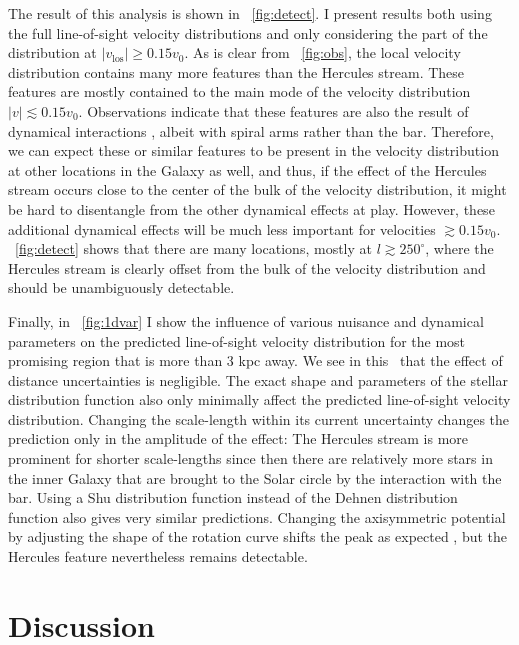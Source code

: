 \documentclass[12pt,preprint]{aastex}
\newcommand{\eg}{e.g.}
\newcommand{\vo}{\ensuremath{v_0}}
\begin{document}
The result of this analysis is shown in
\figurename~\ref{fig:detect}. I present results both using the full
line-of-sight velocity distributions and only considering the part of
the distribution at $|v_{\text{los}}| \geq 0.15 \vo$. As is clear from
\figurename~\ref{fig:obs}, the local velocity distribution contains
many more features than the Hercules stream. These features are mostly
contained to the main mode of the velocity distribution $|v| \lesssim
0.15 \vo$. Observations indicate that these features are also the
result of dynamical interactions \citep[\eg,][]{Bovy10a,sellwood10a},
albeit with spiral arms rather than the bar. Therefore, we can expect
these or similar features to be present in the velocity distribution
at other locations in the Galaxy as well, and thus, if the effect of
the Hercules stream occurs close to the center of the bulk of the
velocity distribution, it might be hard to disentangle from the other
dynamical effects at play. However, these additional dynamical effects
will be much less important for velocities $\gtrsim 0.15
\vo$. \figurename~\ref{fig:detect} shows that there are many
locations, mostly at $l \gtrsim 250^{\circ}$, where the Hercules
stream is clearly offset from the bulk of the velocity distribution
and should be unambiguously detectable.

Finally, in \figurename~\ref{fig:1dvar} I show the influence of
various nuisance and dynamical parameters on the predicted
line-of-sight velocity distribution for the most promising region that
is more than 3 kpc away. We see in this \figurename\ that the effect
of distance uncertainties is negligible. The exact shape and
parameters of the stellar distribution function also only minimally
affect the predicted line-of-sight velocity distribution. Changing the
scale-length within its current uncertainty changes the prediction
only in the amplitude of the effect: The Hercules stream is more
prominent for shorter scale-lengths since then there are relatively
more stars in the inner Galaxy that are brought to the Solar circle by
the interaction with the bar. Using a Shu distribution function
\citep{shu69a} instead of the Dehnen distribution function also gives
very similar predictions. Changing the axisymmetric potential by
adjusting the shape of the rotation curve shifts the peak as expected
\citep[see][]{dehnen00a}, but the Hercules feature nevertheless
remains detectable.



\section{Discussion}
\end{document}
